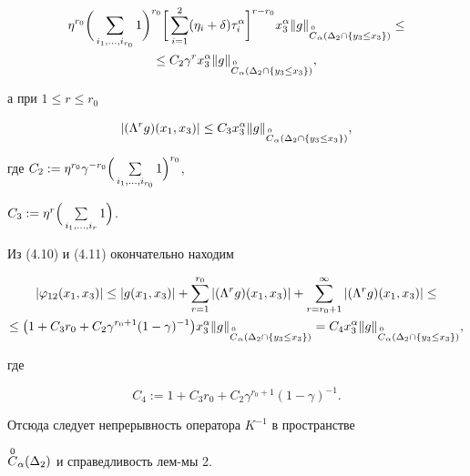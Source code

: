\begin{pf}
\begin{gather}
\eta^{r_0}\bigg(\sum_{i_1,\ds,i_{r_0}}1\bigg)^{r_0} \bigg[\sum_{i=1}^2(


\eta_i+\dl)\tau_i^\al \bigg]^{r-r_0}x_3^\al\|g\|_{\oc_{\al}(\Delta_2\cap\{y_3


\leq x_3 \})}\leq\notag \\


\leq C_2 \gamma^r x_3^\al \|g\|_{\oc_{\al}(\Delta_2\cap \{y_3\leq x_3 \})},


\end{gather}


а при $1\leq r\leq r_0$




\begin{equation}


|(\Lb^r g)(x_1,x_3)|\leq C_3x_3^\al \|g\|_{\oc_{\al}(\Delta_2\cap \{y_3


\leq x_3 \})},


\end{equation}


где $C_2:=\eta^{r_0}\gamma^{-r_0}\Big(


\sum\limits_{i_1,\ds,i_{r_0}}1\Big)^{r_0}$,


$C_3:=\eta^r\Big(\sum\limits_{i_1,\dotsc,i_r}1\Big )$.





Из (4.10) и (4.11) окончательно находим


\begin{gather*}


|\vf_{12}(x_1,x_3)|\leq |g(x_1,x_3)|+\sum_{r=1}^{r_0}|(\Lb^r g)(x_1,x_3)|+


\sum_{r=r_0+1}^\iy |(\Lb^r g)(x_1,x_3)|\leq \\


\leq \big (1+C_3r_0+C_2\gamma^{r_0+1}(1-\gamma)^{-1}\big )x_3^\al\|g\|_{\oc_{


\al}(\Delta_2\cap \{y_3 \leq x_3 \})}=C_4x_3^{\al}\|g\|_{\oc_{\al}(\Delta_2


\cap \{y_3 \leq x_3\})},


\end{gather*}


где


$$


C_4:=1+C_3r_0+C_2\gamma^{r_0+1}(1-\gamma)^{-1}.


$$


Отсюда следует непрерывность оператора $K^{-1}$ в пространстве


$\overset{0}{C}{}_\alpha (\Delta_2)$ и справедливость лем-\linebreak мы 2.


\end{pf}





